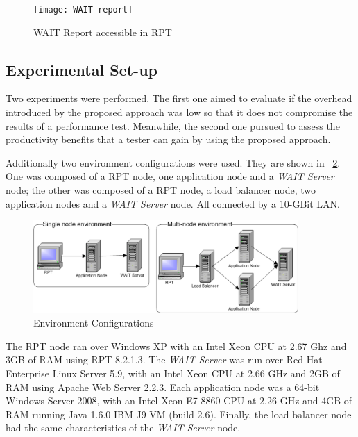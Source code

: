 \documentclass[runningheads,a4paper]{llncs}
\begin{document}
\begin{figure}[!h]
\centering
\texttt{[image: WAIT-report]}
\caption{WAIT Report accessible in RPT}
\label{fig_report}
\end{figure}

\vspace{-5pt}
\subsection{Experimental Set-up}
\vspace{-5pt}
Two experiments were performed. The first one aimed to evaluate if the overhead
introduced by the proposed approach was low so that it does not compromise the
results of a performance test. Meanwhile, the second one pursued to
assess the productivity benefits that a tester can gain by using the proposed
approach.

Additionally two environment configurations were used. They are shown in
\figurename ~\ref{fig_env}. One was composed of a RPT node, one application node
and a \emph{WAIT Server} node; the other was composed of a RPT node, a load
balancer node, two application nodes and a \emph{WAIT Server} node. All
connected by a 10-GBit LAN.

\begin{figure}[!h]
\centering
\includegraphics[totalheight=.15\textheight,width=0.9\textwidth]{Environments}
\caption{Environment Configurations}
\label{fig_env}
\end{figure}

The RPT node ran over Windows XP with an Intel Xeon CPU at
2.67 Ghz and 3GB of RAM using RPT 8.2.1.3. The \emph{WAIT Server} was run over
Red Hat Enterprise Linux Server 5.9, with an Intel Xeon CPU at 2.66 GHz and 2GB of
RAM using Apache Web Server 2.2.3. Each application node was a 64-bit Windows
Server 2008, with an Intel Xeon E7-8860 CPU at 2.26 GHz and 4GB of RAM
running Java 1.6.0 IBM J9 VM (build 2.6). Finally, the load balancer node had
the same characteristics of the \emph{WAIT Server} node. 

\vspace{-5pt}
\end{document}
